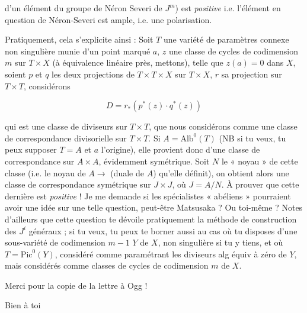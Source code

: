 \documentclass[11pt,a4paper]{article}
\begin{document}

d'un élément du groupe de Néron Severi de $J^{m}$) est \emph{positive} i.e.
l'élément en question de Néron-Severi est ample, i.e. une polarisation.

Pratiquement, cela s'explicite ainsi : Soit $T$ une variété de paramètres
connexe non singulière munie d'un point marqué $a$, $z$ une classe de cycles de
codimension $m$ sur $T\times X$ (à équivalence linéaire près, mettons), telle
que $z(a) = 0$ dans $X$, soient $p$ et $q$ les deux projections de $T\times
T\times X$ sur $T\times X$, $r$ sa projection sur $T\times T$, considérons

\[
  D = r_{*}\!\left(p^{*}(z)\cdot q^{*}(z)\right)
\]

qui est une classe de diviseurs sur $T\times T$, que nous considérons comme une
classe de correspondance divisorielle sur $T\times T$. Si $A =
\mathrm{Alb}^{0}(T)$ (NB si tu veux, tu peux supposer $T = A$ et $a$
l'origine), elle provient donc d'une classe de correspondance sur $A\times A$,
évidemment symétrique. Soit $N$ le « noyau » de cette classe (i.e. le noyau de
$A \longrightarrow$ (duale de $A$) qu'elle définit), on obtient alors une classe
de correspondance symétrique sur $J\times J$, où $J = A/N$. À prouver que cette
dernière est \emph{positive} ! Je me demande si les spécialistes « abéliens »
pourraient avoir une idée sur une telle question, peut-être Matsusaka ? Ou
toi-même ? Notes d'ailleurs que cette question te dévoile pratiquement la
méthode de construction des $J^{i}$ généraux ; si tu veux, tu peux te borner
aussi au cas où tu disposes d'une sous-variété de codimension $m-1$ $Y$ de $X$,
non singulière si tu y tiens, \struck{\ill{}} et où $T = \mathrm{Pic}^{0}(Y)$,
considéré comme paramétrant les diviseurs alg équiv à zéro de $Y$, mais
considérés comme classes de cycles \struck{\ill{}} de codimension $m$ de $X$.


Merci pour la copie de la lettre à Ogg !

Bien à toi
\end{document}
